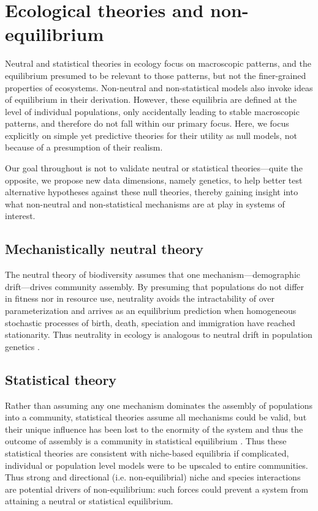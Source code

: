 \documentclass[12pt]{article}
\begin{document}
\section{Ecological theories and non-equilibrium}

Neutral and statistical theories in ecology focus on macroscopic
patterns, and the equilibrium presumed to be relevant to those
patterns, but not the finer-grained properties of ecosystems. Non-neutral and
non-statistical models \citep[e.g.,][]{Tilman2004-xt, Chesson2000-uc}
also invoke ideas of equilibrium in their derivation. However, these
equilibria are defined at the level of individual populations,
only accidentally leading to stable macroscopic patterns, and therefore do not
fall within our primary focus.  Here, we focus explicitly on simple yet
predictive theories for their utility as null models, not because of a
presumption of their realism.

Our goal throughout is not to validate neutral or statistical
theories---quite the opposite, we propose new data dimensions, namely
genetics, to help better test alternative hypotheses against these
null theories, thereby gaining insight into what non-neutral and
non-statistical mechanisms are at play in systems of interest.

\subsection{Mechanistically neutral theory}

The neutral theory of biodiversity \citep[NTB;][]{Hubbell2001-dx}
assumes that one mechanism---demographic drift---drives community
assembly. By presuming that populations do not differ in fitness nor
in resource use, neutrality avoids the intractability of over
parameterization and arrives as an equilibrium prediction when
homogeneous stochastic processes of birth, death, speciation and
immigration have reached stationarity. Thus neutrality in ecology is
analogous to neutral drift in population genetics
\citep{Hubbell2001-dx}.

\subsection{Statistical theory} \label{sec:statThr}

Rather than assuming any one mechanism dominates the assembly of
populations into a community,  statistical  theories
assume all mechanisms could be valid, but their unique influence
has been lost to the enormity of the system and thus the outcome of
assembly is a community in statistical equilibrium \citep{Harte2011-um, Pueyo2007-iq}. Thus these statistical theories are consistent with niche-based equilibria \citep{pueyo2007, neill2009} if complicated, individual or population level models were to be upscaled to entire communities. Thus strong and directional (i.e. non-equilibrial) niche and species interactions are potential drivers of
non-equilibrium: such forces could prevent a system from attaining a neutral or
statistical equilibrium.
\end{document}

